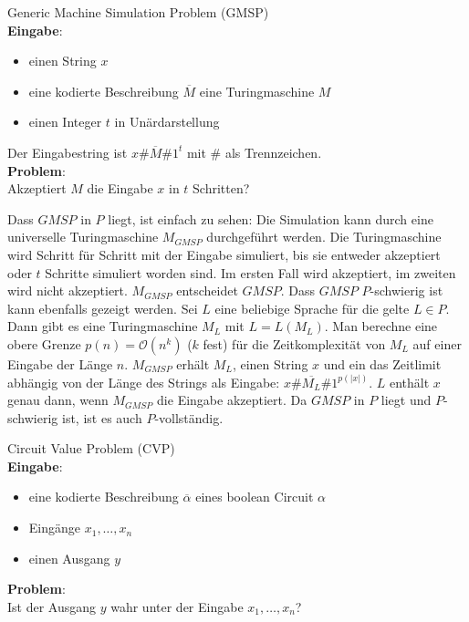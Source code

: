 \begin{problem}
    Generic Machine Simulation Problem (GMSP) \\
    \textbf{Eingabe}:
    \begin{itemize}
        \item einen String $x$
        \item eine kodierte Beschreibung $\overline{M}$ eine Turingmaschine $M$
        \item einen Integer $t$ in Unärdarstellung
    \end{itemize}
    Der Eingabestring ist $x\#\overline{M}\#1^t$ mit $\#$ als Trennzeichen. \\
    \textbf{Problem}: \\
    Akzeptiert $M$ die Eingabe $x$ in $t$ Schritten?
    \cite[S.215]{greenlaw}
\end{problem}
Dass $GMSP$ in $P$ liegt, ist einfach zu sehen:
Die Simulation kann durch eine universelle Turingmaschine $M_{GMSP}$
durchgeführt werden.
Die Turingmaschine wird Schritt für Schritt mit der Eingabe simuliert, bis sie
entweder akzeptiert oder $t$ Schritte simuliert worden sind.
Im ersten Fall wird akzeptiert, im zweiten wird nicht akzeptiert.
$M_{GMSP}$ entscheidet $GMSP$.
Dass $GMSP$ $P$-schwierig ist kann ebenfalls gezeigt werden.
Sei $L$ eine beliebige Sprache für die gelte $L \in P$.
Dann gibt es eine Turingmaschine $M_L$ mit $L = L(M_L)$.
Man berechne eine obere Grenze $p(n) = \mathcal{O}(n^k)$ ($k$ fest) für die
Zeitkomplexität von $M_L$ auf einer Eingabe der Länge $n$.
$M_{GMSP}$ erhält $M_L$, einen String $x$ und ein das Zeitlimit abhängig von der
Länge des Strings als Eingabe: $x\#\overline{M_L}\#1^{p(|x|)}$.
$L$ enthält $x$ genau dann, wenn $M_{GMSP}$ die Eingabe akzeptiert.
Da $GMSP$ in $P$ liegt und $P$-schwierig ist, ist es auch $P$-vollständig.
\cite[S.57ff]{greenlaw}


\begin{problem}
    Circuit Value Problem (CVP) \\
    \textbf{Eingabe}:
    \begin{itemize}
        \item eine kodierte Beschreibung $\overline{\alpha}$ eines
            boolean Circuit $\alpha$
        \item Eingänge $x_1, \ldots, x_n$
        \item einen Ausgang $y$
    \end{itemize}
    \textbf{Problem}: \\
    Ist der Ausgang $y$ wahr unter der Eingabe $x_1, \ldots, x_n$?
\end{problem}


